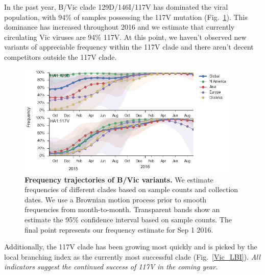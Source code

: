 \documentclass[11pt,oneside,letterpaper]{article}
\begin{document}
\pagebreak

In the past year, B/Vic clade 129D/146I/117V has dominated the viral population, with 94\% of samples possessing the 117V mutation (Fig.\ \ref{Vic_mutations}). This dominance has increased throughout 2016 and we estimate that currently circulating Vic viruses are 94\% 117V. At this point, we haven't observed new variants of appreciable frequency within the 117V clade and there aren't decent competitors outside the 117V clade.

\begin{figure}[H]
	\centering
	\includegraphics[width=0.95\textwidth]{../figures/sep-2016/Vic_mutations.png}
	\caption{\textbf{Frequency trajectories of B/Vic variants.}
	We estimate frequencies of different clades based on sample counts and collection dates.
	We use a Brownian motion process prior to smooth frequencies from month-to-month.
	Transparent bands show an estimate the 95\% confidence interval based on sample counts.
	The final point represents our frequency estimate for Sep 1 2016.
	}
	\label{Vic_mutations}
\end{figure}

\pagebreak

Additionally, the 117V clade has been growing most quickly and is picked by the local branching index \cite{neher2014predicting} as the currently most successful clade (Fig.\ \ref{Vic_LBI}). \textit{All indicators suggest the continued success of 117V in the coming year.}
\end{document}
